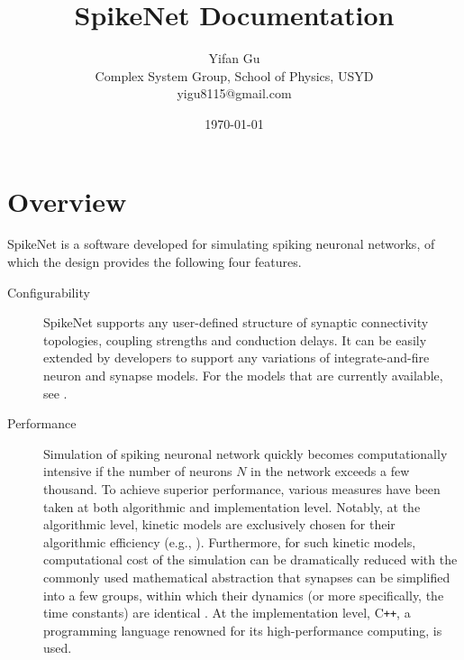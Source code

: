 \documentclass{article}
\title{SpikeNet Documentation}
\author{Yifan Gu  \\
	Complex System Group, School of Physics, USYD  \\
	yigu8115@gmail.com \\
	}
\date{\today}
\begin{document}
 \maketitle

\section{Overview}
SpikeNet is a software developed for simulating spiking neuronal networks, of which the design provides the following four features.

\begin{description}

\item [Configurability] SpikeNet supports any user-defined structure of synaptic connectivity topologies, coupling strengths and conduction delays. It can be easily extended by developers to support any variations of integrate-and-fire neuron and synapse models. For the models that are currently available, see .

\item [Performance]  Simulation of spiking neuronal network quickly becomes computationally intensive if the number of neurons $N$ in the network exceeds a few thousand. To achieve superior performance, various measures have been taken at both algorithmic and implementation level. Notably, at the algorithmic level, kinetic models are exclusively chosen for their algorithmic efficiency (e.g., \cite{destexhe1998kinetic, vogels2011inhibitory, hennig2015theoretical}). Furthermore, for such kinetic models, computational cost of the simulation can be dramatically reduced  with the commonly used mathematical abstraction that synapses can be simplified into a few groups, within which their dynamics (or more specifically, the time constants) are identical \cite{destexhe1994efficient}. At the implementation level, C\texttt{++}, a programming language renowned for its high-performance computing, is used.


\end{description}
\end{document}
